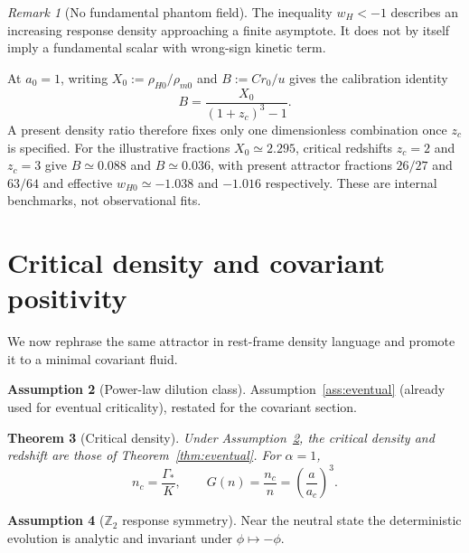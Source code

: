 \documentclass[11pt]{article}
\newtheorem{theorem}{Theorem}[section]
\theoremstyle{definition}
\newtheorem{assumption}[theorem]{Assumption}
\theoremstyle{remark}
\newtheorem{remark}[theorem]{Remark}
\begin{document}
\begin{remark}[No fundamental phantom field]
\label{rem:phantom}
The inequality $w_H<-1$ describes an increasing response density approaching a finite asymptote.
It does not by itself imply a fundamental scalar with wrong-sign kinetic term.
\end{remark}

At $a_0=1$, writing $X_0:=\rho_{H0}/\rho_{m0}$ and $B:=C r_0/u$ gives the calibration identity
\begin{equation}
\label{eq:B-cal}
\boxed{B=\frac{X_0}{(1+z_c)^3-1}.}
\end{equation}
A present density ratio therefore fixes only one dimensionless combination once $z_c$ is specified.
For the illustrative fractions $X_0\simeq2.295$, critical redshifts $z_c=2$ and $z_c=3$ give $B\simeq0.088$ and $B\simeq0.036$, with present attractor fractions $26/27$ and $63/64$ and effective $w_{H0}\simeq-1.038$ and $-1.016$ respectively.
These are internal benchmarks, not observational fits.

\section{Critical density and covariant positivity}
\label{sec:covariant}
We now rephrase the same attractor in rest-frame density language and promote it to a minimal covariant fluid.

\begin{assumption}[Power-law dilution class]
\label{ass:powerlaw}
Assumption~\ref{ass:eventual} (already used for eventual criticality), restated for the covariant section.
\end{assumption}

\begin{theorem}[Critical density]
\label{thm:critical-density}
Under Assumption~\ref{ass:powerlaw}, the critical density and redshift are those of Theorem~\ref{thm:eventual}.
For $\alpha=1$,
\begin{equation}
\label{eq:nc-linear}
\boxed{n_c=\frac{\Gamma_*}{K},\qquad G(n)=\frac{n_c}{n}=\left(\frac a{a_c}\right)^3.}
\end{equation}
\end{theorem}

\begin{assumption}[$\mathbb Z_2$ response symmetry]
\label{ass:Z2}
Near the neutral state the deterministic evolution is analytic and invariant under $\phi\mapsto-\phi$.
\end{assumption}
\end{document}
